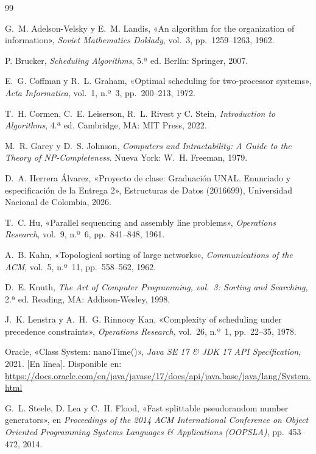 \documentclass[11pt,letterpaper]{article}
\begin{document}
\begin{thebibliography}{99}

 G.~M. Adelson-Velsky y E.~M. Landis, «An algorithm for the organization of information», \emph{Soviet Mathematics Doklady}, vol.~3, pp.~1259--1263, 1962.

 P. Brucker, \emph{Scheduling Algorithms}, 5.ª ed. Berlín: Springer, 2007.

 E.~G. Coffman y R.~L. Graham, «Optimal scheduling for two-processor systems», \emph{Acta Informatica}, vol.~1, n.º~3, pp.~200--213, 1972.

 T.~H. Cormen, C.~E. Leiserson, R.~L. Rivest y C. Stein, \emph{Introduction to Algorithms}, 4.ª ed. Cambridge, MA: MIT Press, 2022.

 M.~R. Garey y D.~S. Johnson, \emph{Computers and Intractability: A Guide to the Theory of NP-Completeness}. Nueva York: W.~H. Freeman, 1979.

 D.~A. Herrera Álvarez, «Proyecto de clase: Graduación UNAL. Enunciado y especificación de la Entrega 2», Estructuras de Datos (2016699), Universidad Nacional de Colombia, 2026.

 T.~C. Hu, «Parallel sequencing and assembly line problems», \emph{Operations Research}, vol.~9, n.º~6, pp.~841--848, 1961.

 A.~B. Kahn, «Topological sorting of large networks», \emph{Communications of the ACM}, vol.~5, n.º~11, pp.~558--562, 1962.

 D.~E. Knuth, \emph{The Art of Computer Programming, vol.~3: Sorting and Searching}, 2.ª ed. Reading, MA: Addison-Wesley, 1998.

 J.~K. Lenstra y A.~H.~G. Rinnooy Kan, «Complexity of scheduling under precedence constraints», \emph{Operations Research}, vol.~26, n.º~1, pp.~22--35, 1978.

 Oracle, «Class System: nanoTime()», \emph{Java SE 17 \& JDK 17 API Specification}, 2021. [En línea]. Disponible en: \url{https://docs.oracle.com/en/java/javase/17/docs/api/java.base/java/lang/System.html}

 G.~L. Steele, D. Lea y C.~H. Flood, «Fast splittable pseudorandom number generators», en \emph{Proceedings of the 2014 ACM International Conference on Object Oriented Programming Systems Languages \& Applications (OOPSLA)}, pp.~453--472, 2014.


\end{thebibliography}
\end{document}
